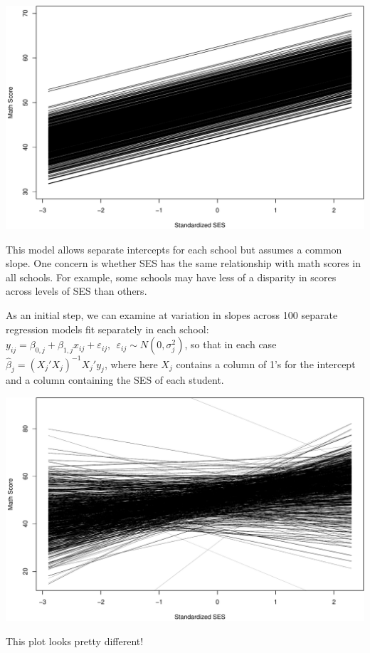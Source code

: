 \documentclass[ignorenonframetext,]{beamer}
\begin{document}
\begin{frame}{}

\includegraphics{anova_06_deck_files/figure-beamer/schoolspecific1b-1.pdf}

\end{frame}

\begin{frame}{}

This model allows separate intercepts for each school but assumes a
common slope. One concern is whether SES has the same relationship with
math scores in all schools. For example, some schools may have less of a
disparity in scores across levels of SES than others.

As an initial step, we can examine at variation in slopes across 100
separate regression models fit separately in each school:
\(y_{ij}=\beta_{0,j}+\beta_{1,j}x_{ij}+\varepsilon_{ij}, ~~ \varepsilon_{ij} \sim N(0,\sigma^2_j)\),
so that in each case \(\widehat{\beta}_j=(X_j'X_j)^{-1}X_j'y_j\), where
here \(X_j\) contains a column of 1's for the intercept and a column
containing the SES of each student.

\end{frame}

\begin{frame}{}

\includegraphics{anova_06_deck_files/figure-beamer/schoolspecific2b-1.pdf}

This plot looks pretty different!

\end{frame}
\end{document}
